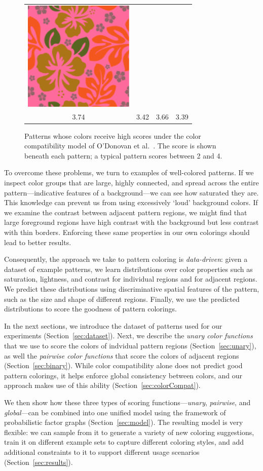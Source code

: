 \begin{figure}[htb]
\begin{tabular}{cccc}
\includegraphics[width=.2\columnwidth]{figs/colorCompat/r_1_3_3-39}\\
3.74&3.42&3.66&3.39\\
\end{tabular}
\caption{Patterns whose colors receive high scores under the color compatibility model of O'Donovan et al.~. The score is shown beneath each pattern; a typical pattern scores between 2 and 4.}%
\label{fig:ColorCompatOnly}
\end{figure}

To overcome these problems, we turn to examples of well-colored patterns. If we inspect color groups that are large, highly connected, and spread across the entire pattern---indicative features of a background---we can see how saturated they are. This knowledge can prevent us from using excessively `loud' background colors. If we examine the contrast between adjacent pattern regions, we might find that large foreground regions have high contrast with the background but less contrast with thin borders. Enforcing these same properties in our own colorings should lead to better results.

Consequently, the approach we take to pattern coloring is \emph{data-driven}: given a dataset of example patterns, we learn distributions over color properties such as saturation, lightness, and contrast for individual regions and for adjacent regions. We predict these distributions using discriminative spatial features of the pattern, such as the size and shape of different regions. Finally, we use the predicted distributions to score the goodness of pattern colorings.

In the next sections, we introduce the dataset of patterns used for our experiments (Section~\ref{sec:dataset}). Next, we describe the \emph{unary color functions} that we use to score the colors of indvidual pattern regions (Section~\ref{sec:unary}), as well the \emph{pairwise color functions} that score the colors of adjacent regions (Section~\ref{sec:binary}). While color compatibility alone does not predict good pattern colorings, it helps enforce global consistency between colors, and our approach makes use of this ability (Section~\ref{sec:colorCompat}).

We then show how these three types of scoring functions---\emph{unary}, \emph{pairwise}, and \emph{global}---can be combined into one unified model using the framework of probabilistic factor graphs (Section~\ref{sec:model}). The resulting model is very flexible: we can sample from it to generate a variety of new coloring suggestions, train it on different example sets to capture different coloring styles, and add additional constraints to it to support different usage scenarios (Section~\ref{sec:results}).
